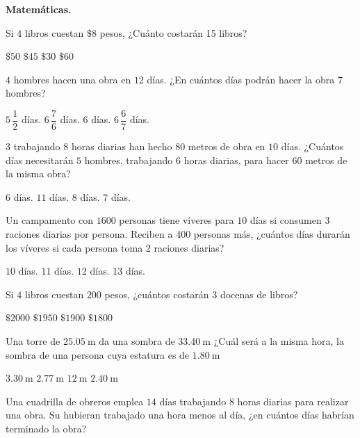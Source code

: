\documentclass[12pt, letter]{exam}
\begin{document}
\textbf{Matemáticas.}
\begin{multicols}{2}
\begin{questions}
     \question Si $4$ libros cuestan $\$8$ pesos, ¿Cuánto costarán 15 libros?
     \begin{choices}
         \choice $\$50$
         \choice $\$45$
         \choice $\$30$
         \choice $\$60$
     \end{choices}
     \question $4$ hombres hacen una obra en $12$ días. ¿En cuántos días podrán hacer la obra $7$ hombres?
     \begin{choices}
        \choice $5 \, \dfrac{1}{2}$ días.
        \choice $6 \, \dfrac{7}{6}$ días.
        \choice $6$ días.
        \choice $6 \, \dfrac{6}{7}$ días.
    \end{choices}
    \question $3$ trabajando $8$ horas diarias han hecho $80$ metros de obra en $10$ días. ¿Cuántos días necesitarán $5$ hombres, trabajando $6$ horas diarias, para hacer $60$ metros de la misma obra?
     \begin{choices}
        \choice $6$ días.
        \choice $11$ días.
        \choice $8$ días.
        \choice $7$ días.
    \end{choices}
    \question Un campamento con $1600$ personas tiene víveres para $10$ días si consumen $3$ raciones diarias por persona. Reciben a $400$ personas más, ¿cuántos días durarán los víveres si cada persona toma $2$ raciones diarias?
     \begin{choices}
        \choice $10$ días.
        \choice $11$ días.
        \choice $12$ días.
        \choice $13$ días.
    \end{choices}
    \question Si $4$ libros cuestan $200$ pesos, ¿cuántos costarán $3$ docenas de libros?
     \begin{choices}
        \choice $\$2000$ 
        \choice $\$1950$ 
        \choice $\$1900$ 
        \choice $\$1800$
    \end{choices}
    \question Una torre de $\SI{25.05}{\meter}$ da una sombra de $\SI{33.40}{\meter}$ ¿Cuál será a la misma hora, la sombra de una persona cuya estatura es de $\SI{1.80}{\meter}$
     \begin{choices}
        \choice $\SI{3.30}{\meter}$ 
        \choice $\SI{2.77}{\meter}$ 
        \choice $\SI{12}{\meter}$ 
        \choice $\SI{2.40}{\meter}$
    \end{choices}
    \question Una cuadrilla de obreros emplea $14$ días trabajando $8$ horas diarias para realizar una obra. Su hubieran trabajado una hora menos al día, ¿en cuántos días habrían terminado la obra?

\end{questions}
\end{multicols}
\end{document}
